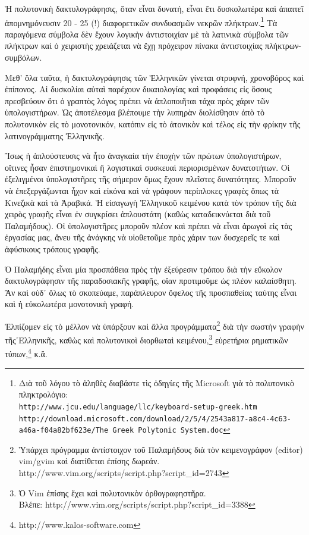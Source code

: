 \documentclass[12pt,a4paper]{article}
\begin{document}
  Ἡ πολυτονικὴ δακτυλογράφησις, ὅταν εἶναι δυνατή, εἶναι ἔτι δυσκολωτέρα καὶ
  ἀπαιτεῖ ἀπομνημόνευσιν 20 - 25 (!) διαφορετικῶν συνδυασμῶν νεκρῶν
  πλήκτρων.\footnote{Διὰ τοῦ λόγου τὸ ἀληθὲς διαβάστε τὶς ὁδηγίες τῆς Microsoft 
  γιὰ τὸ πολυτονικὸ πληκτρολόγιο:\\
  \texttt{http://www.jcu.edu/language/llc/keyboard-setup-greek.htm}\\
  \texttt{\scriptsize{http://download.microsoft.com/download/2/5/4/2543a817-a8c4-4c63-a46a-f04a82bf623e/The Greek Polytonic System.doc}}} 
  Τὰ παραγόμενα σύμβολα δὲν ἔχουν λογικὴν ἀντιστοιχίαν μὲ τὰ λατινικὰ σύμβολα τῶν
  πλήκτρων καὶ ὁ χειριστὴς χρειάζεται νὰ ἔχῃ πρόχειρον πίνακα
  ἀντιστοιχίας πλήκτρων-συμβόλων.

  Μεθ’ ὅλα ταῦτα, ἡ δακτυλογράφησις τῶν Ἑλληνικῶν γίνεται στρυφνή,
  χρονοβόρος καὶ ἐπίπονος. Αἱ δυσκολίαι αὐταὶ παρέχουν δικαιολογίας καὶ
  προφάσεις εἰς ὅσους πρεσβεύουν ὅτι ὁ γραπτὸς λόγος πρέπει νὰ ἀπλοποιῆται
  τάχα πρὸς χάριν τῶν ὑπολογιστήρων.  Ὡς ἀποτέλεσμα βλέπουμε τὴν λυπηρὰν
  διολίσθησιν ἀπὸ τὸ πολυτονικὸν εἰς τὸ μονοτονικόν, κατόπιν εἰς τὸ
  ἀτονικὸν καὶ τέλος εἰς τὴν φρίκην τῆς λατινογράμματης Ἑλληνικῆς.

  Ἴσως ἡ ἁπλούστευσις νὰ ἦτο ἀναγκαία τὴν ἐποχὴν τῶν πρώτων ὑπολογιστήρων,
  οἵτινες ἦσαν ἐπιστημονικαὶ ἢ λογιστικαὶ συσκευαὶ περιορισμένων
  δυνατοτήτων.  Οἱ ἐξελιγμένοι ὑπολογιστῆρες τῆς σήμερον ὅμως ἔχουν
  πλεῖστες δυνατότητες.  Μποροῦν νὰ ἐπεξεργάζωνται ἦχον καὶ εἰκόνα καὶ νὰ
  γράφουν περίπλοκες γραφὲς ὅπως τὰ Κινεζικὰ καὶ τὰ Ἀραβικά. Ἡ εἰσαγωγὴ
  Ἑλληνικοῦ κειμένου κατὰ τὸν τρόπον τῆς διὰ χειρὸς γραφῆς εἶναι ἐν
  συγκρίσει ἁπλουστάτη (καθὼς καταδεικνύεται διὰ τοῦ Παλαμήδους).  Οἱ
  ὑπολογιστῆρες μποροῦν πλέον καὶ πρέπει νὰ εἶναι ἀρωγοὶ εἰς τὰς ἐργασίας
  μας, ἄνευ τῆς ἀνάγκης νὰ υἱοθετοῦμε πρὸς χάριν των δυσχερεῖς τε καὶ
  ἀφύσικους τρόπους γραφῆς.

  Ὁ Παλαμήδης εἶναι μία προσπάθεια πρὸς τὴν ἐξεύρεσιν τρόπου διὰ τὴν εὔκολον 
  δακτυλογράφησιν τῆς παραδοσιακῆς γραφῆς, οἵαν προτιμοῦμε ὡς πλέον
  καλαίσθητη. Ἂν καὶ οὐδ᾽ ὅλως τὸ σκοπεύαμε, παράπλευρον ὄφελος τῆς προσπαθείας 
  ταύτης εἶναι καὶ ἡ εὐκολωτέρα μονοτονικὴ γραφή.

  Ἐλπίζομεν εἰς τὸ μέλλον νὰ ὑπάρξουν καὶ ἄλλα προγράμματα\footnote{Ὑπάρχει
  πρόγραμμα ἀντίστοιχον τοῦ Παλαμήδους διὰ τὸν κειμενογράφον (editor) vim/gvim
  καὶ διατίθεται ἐπίσης δωρεάν.
  http://www.vim.org/scripts/script.php?script\_id=2743} διὰ τὴν σωστὴν
  γραφὴν τῆς῾Ελληνικῆς, καθὼς καὶ πολυτονικοὶ διορθωταὶ
  κειμένου,\footnote{Ὁ Vim ἐπίσης ἔχει καὶ πολυτονικὸν ὁρθογραφηστῆρα.\\
  Βλέπε: http://www.vim.org/scripts/script.php?script\_id=3388} εὑρετήρια
  ρηματικῶν τύπων,\footnote{http://www.kalos-software.com} κ.ἄ.
\end{document}
